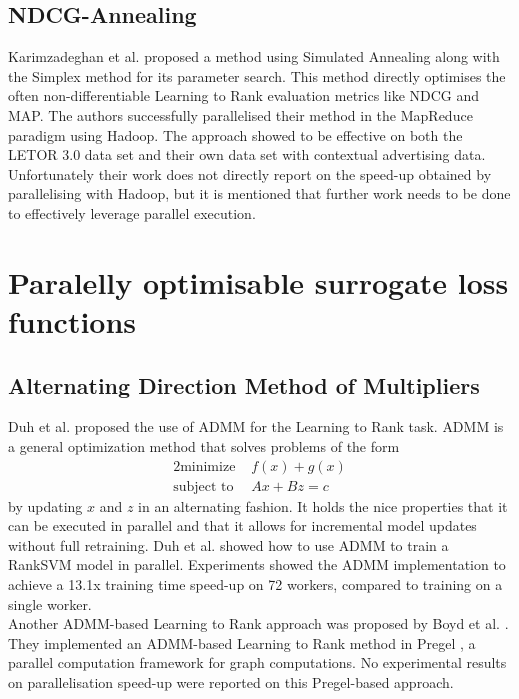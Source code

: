\subsection{NDCG-Annealing}
Karimzadeghan et al. \cite{Karimzadehgan2011} proposed a method using Simulated Annealing along with the Simplex method for its parameter search. This method directly optimises the often non-differentiable Learning to Rank evaluation metrics like \ac{NDCG} and \ac{MAP}. The authors successfully parallelised their method in the MapReduce paradigm using Hadoop. The approach showed to be effective on both the LETOR 3.0 data set and their own data set with contextual advertising data. Unfortunately their work does not directly report on the speed-up obtained by parallelising  with Hadoop, but it is mentioned that further work needs to be done to effectively leverage parallel execution.\\

\section{Paralelly optimisable surrogate loss functions}
\subsection{Alternating Direction Method of Multipliers}
Duh et al. \cite{Duh2011} proposed the use of \ac{ADMM} for the Learning to Rank task. \ac{ADMM} is a general optimization method that solves problems of the form
\begin{alignat*}{2}
\text{minimize }   &  f(x) + g(x) \\
\text{subject to } &  Ax + Bz = c
\end{alignat*}
by updating $x$ and $z$ in an alternating fashion. It holds the nice properties that it can be executed in parallel and that it allows for incremental model updates without full retraining. Duh et al. \cite{Duh2011} showed how to use \ac{ADMM} to train a Rank\ac{SVM} \cite{Herbrich1999, Joachims2002} model in parallel. Experiments showed the \ac{ADMM} implementation to achieve a 13.1x training time speed-up on 72 workers, compared to training on a single worker.\\

Another \ac{ADMM}-based Learning to Rank approach was proposed by Boyd et al. \cite{Boyd2012}. They implemented an \ac{ADMM}-based Learning to Rank method in Pregel \cite{Malewicz2010}, a parallel computation framework for graph computations. No experimental results on parallelisation speed-up were reported on this Pregel-based approach.
